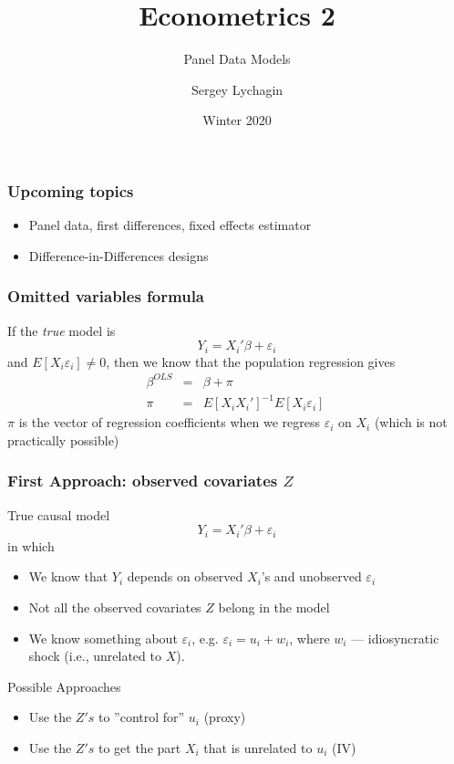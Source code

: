 \documentclass[notes=show,beamer,compress]{beamer}
\title[Panel Data Models]{Econometrics 2}
\subtitle{Panel Data Models}
\author[Lychagin \& Mu\c{c}o]{Sergey Lychagin}
\institute[CEU]{CEU}
\date{Winter 2020}
\begin{document}
\frame{\titlepage}

\begin{frame}
\frametitle{Upcoming topics}

\begin{itemize}
  \item Panel data, first differences, fixed effects estimator
  \item Difference-in-Differences designs

   \end{itemize}
\end{frame}


\begin{frame}
\frametitle{Omitted variables formula}

If the \emph{true} model is
\[ Y_i = X_i'\beta + \varepsilon_i \]
and $E\left[X_i  \varepsilon_i \right]\neq 0$, then we know that the population regression gives 
\begin{eqnarray*}
 \beta^{OLS} &=& \beta + \pi \\
         \pi &=& E\left[X_i  X_i' \right]^{-1} E\left[X_i  \varepsilon_i \right]\
\end{eqnarray*}
$\pi$ is the vector of regression coefficients when we regress $\varepsilon_i$ on $X_i$ (which is not practically possible)

\end{frame}


\begin{frame}
\frametitle{First Approach: observed covariates $Z$}

True causal model
\[ Y_i = X_i'\beta + \varepsilon_i \]
in which
\begin{itemize}
  \item We know that $Y_i$ depends on observed $X_i$'s and unobserved $\varepsilon_i$
  \item Not all the observed covariates $Z$ belong in the model 
  \item We know something about $\varepsilon_i$, e.g. $\varepsilon_i=u_i + w_i$, where $w_i$ --- idiosyncratic shock (i.e., unrelated to $X$).
 \end{itemize}
 
 Possible Approaches
 
 \begin{itemize}
  \item Use the $Z's$ to ''control for'' $u_i$ (proxy)
  \item  Use the $Z's$ to get the part $X_i$ that is unrelated to $u_i$ (IV)
 \end{itemize}
\end{frame}
\end{document}

